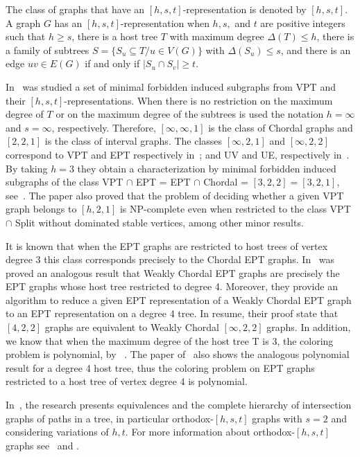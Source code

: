 The class of graphs that have an $[h,s,t]$-representation is denoted by $[h,s,t]$. A graph $G$ has an $[h,s,t]$-representation  when $h,s,$ and $t$ are positive integers such that $h \geq s$, there is a host tree $T$ with maximum degree $\Delta(T) \leq h$, there is a family of subtrees $S = \{S_u \subseteq T / u\in V(G) \}$ with $\Delta(S_u)\leq s$, and there is an edge $uv \in E(G)$ if and only if $|S_u \cap S_v|\geq t$.    

In~\citet{alcon2015characterizing} was studied a set of minimal forbidden induced subgraphs from VPT and their $[h,s,t]$-representations.
When there is no restriction on the maximum degree of $T$ or on the maximum degree of the subtrees is used the notation $h=\infty $  and $s=\infty$,  respectively. Therefore, $[\infty, \infty, 1]$ is the class of Chordal graphs and $[2, 2, 1]$ is the class of interval graphs. The classes $[\infty, 2, 1]$ and $[\infty, 2, 2]$ correspond to VPT and EPT respectively in~\cite{golumbic1985edge}; and UV and UE, respectively in~\cite{monma1986intersection}.
By taking $h=3$ they obtain a characterization by minimal forbidden induced subgraphs of the class VPT $\cap$ EPT = EPT $\cap$ Chordal = $[3,2,2] = [3,2,1]$, see~\citet{golumbic1985edge}. The paper also proved that the problem of deciding whether a given VPT graph belongs to $[h,2,1]$ is NP-complete even when restricted to the class VPT $ \cap $ Split without dominated stable vertices, among other minor results.


 It is known that when the EPT graphs are restricted to host trees of vertex degree 3 this class corresponds precisely to the Chordal EPT graphs. In~\citet{golumbic2008representing} was  proved an analogous result that Weakly Chordal EPT graphs are precisely the EPT graphs whose host tree restricted to degree 4. Moreover, they provide an algorithm to reduce a given EPT representation of a Weakly Chordal EPT graph to an EPT representation on a degree 4 tree. In resume, their proof state that  $[4, 2, 2]$ graphs are equivalent to Weakly Chordal $[\infty, 2, 2]$ graphs. In addition, we know that when the maximum degree of the host tree T is 3, the coloring problem is polynomial, by
~\cite{golumbic1985}. The paper of~\cite{golumbic2008representing} also shows the analogous polynomial result for a degree 4 host tree, thus the coloring problem on EPT graphs restricted to a host tree of vertex degree 4 is polynomial.

In~\citet{golumbic2008equivalences}, the research presents equivalences and the complete hierarchy of intersection graphs of paths in a tree, in particular orthodox-$[h,s,t]$ graphs with $s=2$ and considering variations of $h,t$. For more information about orthodox-$[h,s,t]$ graphs see~\citet{jamison2005constant} and \citet{jose2018}.










